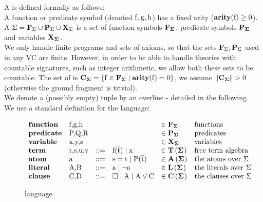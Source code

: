 A  is defined formally as follows:\\
A function or predicate symbol (denoted $\mathrm{f},\mathrm{g},\mathrm{h}$) has a fixed arity ($\mathbf{arity}(\mathrm{f})\geq 0$).\\
A  $\mathrm{\Sigma=\mathbf{F}_{\mathrm{\Sigma}} \cup \mathbf{P}_{\mathrm{\Sigma}} \cup \mathbf{X}_{\mathrm{\Sigma}}}$
is a set of function symbols $\Fs{\sig}$, predicate symbols $\Ps{\sig}$ and variables $\Vs{\sig}$.\\
We only handle finite programs and sets of axioms, so that the sets $\mathbf{F}_{\mathrm{\Sigma}},\mathbf{P}_{\mathrm{\Sigma}}$ used in any VC are finite. 
However, in order to be able to handle theories with countable signatures, such as integer arithmetic, we allow both these sets to be countable.
The set of  is $\m{\consts{}=\s{\func{f} \in \funcs{} \mid \arity{f}=0 }}$, we assume $\|\consts{}\|>0$ (otherwise the ground fragment is trivial).\\
We denote a (possibly empty) tuple by an overline - detailed in the following.\\
We use a standard definition for the language:
\begin{figure}[H]
$
\begin{array}{llllll}
	\mathbf{function}  & \mbox{f,g,h}   &     &                                       & \in \Fs{\sig} & \textrm{functions}\\
	\mathbf{predicate} & \mbox{P,Q,R}   &     &                                       & \in \Ps{\sig} & \textrm{predicates}\\
	\mathbf{variable}  & \mbox{x,y,z}   &     &                                       & \in \Vs{\sig} & \textrm{variables}\\
	\mathbf{term}      & \mbox{t,s,u,v} & ::= & \m{\fa{f}{t} \mid x}                  & \in \Ts{\sig} & \textrm{free term algebra }\\
	\mathbf{atom}      & \mbox{a}       & ::= & \m{s = t \mid \fa{P}{t}}              & \in \As{\sig} & \textrm{the atoms over } \Sigma\\
	\mathbf{literal}   & \mbox{A,B}     & ::= & \mbox{a} \mid \lnot \mbox{a}          & \in \Ls{\sig} & \textrm{the literals over } \Sigma\\
	\mathbf{clause}    & \mbox{C,D}     & ::= & \m{\emptyClause \mid A \mid A \lor C} & \in \Cs{\sig} & \textrm{the clauses over } \Sigma\\
\end{array}
$
\caption{language}
\end{figure}

